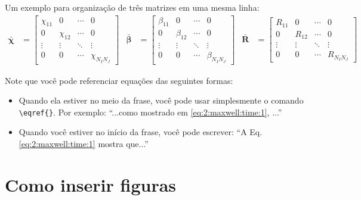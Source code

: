 		Um exemplo para organização de três matrizes em uma mesma linha:
		\begin{align}
			\boldsymbol{\bar{\chi}} &=	\begin{bmatrix}
														 \chi_{11} & 0 & \cdots & 0 \\
														 0 & \chi_{12} & \cdots & 0 \\
														 \vdots & \vdots & \ddots & \vdots \\
														  0 & 0 & \cdots & \chi_{N_IN_J}
													 \end{bmatrix}
			&\boldsymbol{\bar{\beta}} &=	\begin{bmatrix}
																\beta_{11} & 0 & \cdots & 0 \\
																0 & \beta_{12} & \cdots & 0 \\
																\vdots & \vdots & \ddots & \vdots \\
																0 & 0 & \cdots & \beta_{N_IN_J}
															\end{bmatrix}
			&\mathbf{\bar{R}} &=	\begin{bmatrix}
													R_{11} & 0 & \cdots & 0 \\
													0 & R_{12} & \cdots & 0 \\
													\vdots & \vdots & \ddots & \vdots \\
													0 & 0 & \cdots & R_{N_IN_J}
												\end{bmatrix} \label{eq:3:discretization:collocation:18}
		\end{align}

		Note que você pode referenciar equações das seguintes formas:
		\begin{itemize}
			\item Quando ela estiver no meio da frase, você pode usar simplesmente o comando \verb|\eqref{}|. Por exemplo: ``...como mostrado em \eqref{eq:2:maxwell:time:1}, ...''
			\item Quando você estiver no início da frase, você pode escrever: ``A Eq. \eqref{eq:2:maxwell:time:1} mostra que...''
		\end{itemize}
	
	\chapter{Como inserir figuras}

